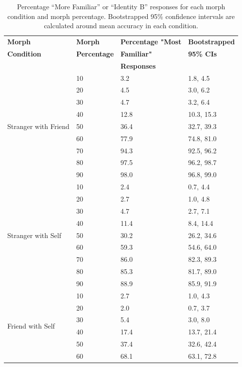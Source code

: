 \documentclass[10pt,letterpaper]{article}
\begin{document}
\begin{table}[ht]
\begin{center}
\caption{\color{Gray} Percentage “More Familiar” or “Identity B” responses for each morph condition and morph percentage. Bootstrapped 95\% confidence intervals are calculated around mean accuracy in each condition. }
\label{Table 4}
\begin{tabular}{ | m{2.75cm} | m{2.75cm} | m{2.75cm} | m{2.75cm} |}
\hline
\textbf{Morph} & \textbf{Morph} & \textbf{Percentage "Most} & \textbf{Bootstrapped} \\
\textbf{Condition} & \textbf{Percentage} & \textbf{Familiar"} & \textbf{95\% CIs} \\ 
 &  & \textbf{Responses} & \\ 
\hline
\multirow{9}{2em}{Stranger with Friend} & 10 & 3.2 & 1.8, 4.5 \\ 
& 20 & 4.5 & 3.0, 6.2 \\ 
& 30 & 4.7 & 3.2, 6.4 \\ 
& 40 & 12.8 & 10.3, 15.3 \\
& 50 & 36.4 & 32.7, 39.3 \\
& 60 & 77.9 & 74.8, 81.0 \\
& 70 & 94.3 & 92.5, 96.2 \\
& 80 & 97.5 & 96.2, 98.7 \\
& 90 & 98.0 & 96.8, 99.0 \\
\hline
\multirow{9}{2em}{Stranger with Self} & 10 & 2.4 & 0.7, 4.4 \\
& 20 & 2.7 & 1.0, 4.8 \\ 
& 30 & 4.7 & 2.7, 7.1 \\ 
& 40 & 11.4 & 8.4, 14.4 \\
& 50 & 30.2 & 26.2, 34.6 \\
& 60 & 59.3 & 54.6, 64.0 \\
& 70 & 86.0 & 82.3, 89.3 \\
& 80 & 85.3 & 81.7, 89.0 \\
& 90 & 88.9 & 85.9, 91.9 \\
\hline
\multirow{9}{2em}{Friend with Self} & 10 & 2.7 &1.0, 4.3 \\ 
& 20 & 2.0 & 0.7, 3.7 \\
& 30 & 5.4 & 3.0, 8.0 \\
& 40 & 17.4 & 13.7, 21.4 \\
& 50 & 37.4 & 32.6, 42.4 \\
& 60 & 68.1 & 63.1, 72.8 \\

\end{tabular}
\end{center}
\end{table}
\end{document}
